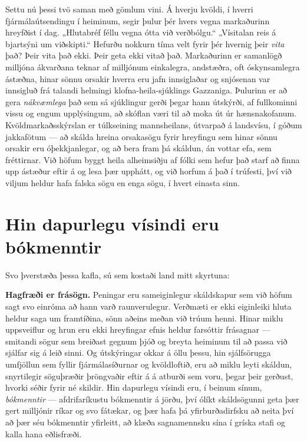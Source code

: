 Settu nú þessi tvö saman með gömlum vini. Á hverju kvöldi, í hverri fjármálaútsendingu í heiminum, segir þulur þér hvers vegna markaðurinn hreyfðist í dag. „Hlutabréf féllu vegna ótta við verðbólgu.“ „Vísitalan reis á bjartsýni um viðskipti.“ Hefurðu nokkurn tíma velt fyrir þér hvernig þeir \emph{vita} það? Þeir vita það ekki. Þeir geta ekki vitað það. Markaðurinn er samanlögð milljóna ákvarðana teknar af milljónum einkalegra, andstæðra, oft óskynsamlegra ástæðna, hinar sönnu orsakir hverra eru jafn innsiglaðar og snjósenan var innsigluð frá talandi helmingi klofna-heila-sjúklings Gazzaniga. Þulurinn er að gera \emph{nákvæmlega} það sem sá sjúklingur gerði þegar hann útskýrði, af fullkominni vissu og engum upplýsingum, að skóflan væri til að moka út úr hænsnakofanum. Kvöldmarkaðsskýrslan er túlkseining mannsheilans, útvarpað á landsvísu, í góðum jakkafötum — að skálda hreina orsakasögu fyrir hreyfingu sem hinar sönnu orsakir eru óþekkjanlegar, og að bera fram þá skáldun, án vottar efa, sem fréttirnar. Við höfum byggt heila alheimsiðju af fólki sem hefur það starf að finna upp ástæður eftir á og lesa þær upphátt, og við horfum á það í trúfesti, því við viljum heldur hafa falska sögu en enga sögu, í hvert einasta sinn.

\section*{Hin dapurlegu vísindi eru bókmenntir}

Svo þverstæða þessa kafla, sú sem kostaði land mitt skyrtuna:

\textbf{Hagfræði er frásögn.} Peningar eru sameiginlegur skáldskapur sem við höfum sagt svo einróma að hann varð raunverulegur. Verðmæti er ekki eiginleiki hluta heldur saga um framtíðina, sönn aðeins meðan við trúum henni. Hinar miklu uppsveiflur og hrun eru ekki hreyfingar efnis heldur farsóttir frásagnar — smitandi sögur sem breiðast gegnum þjóð og breyta heiminum til að passa við sjálfar sig á leið sinni. Og útskýringar okkar á öllu þessu, hin sjálfsörugga umfjöllun sem fyllir fjármálasíðurnar og kvöldloftið, eru að miklu leyti skáldun, snyrtilegir söguþræðir þröngvaðir eftir á á atburði sem voru, þegar þeir gerðust, hvorki séðir fyrir né skildir. Hin dapurlegu vísindi eru, í beinum sínum, \emph{bókmenntir} — afdrifaríkustu bókmenntir á jörðu, því ólíkt skáldsögunni geta þær gert milljónir ríkar og svo fátækar, og þær hafa þá yfirburðadirfsku að neita því að þær séu bókmenntir yfirleitt, að klæða sagnamennsku sína í gríska stafi og kalla hana eðlisfræði.

